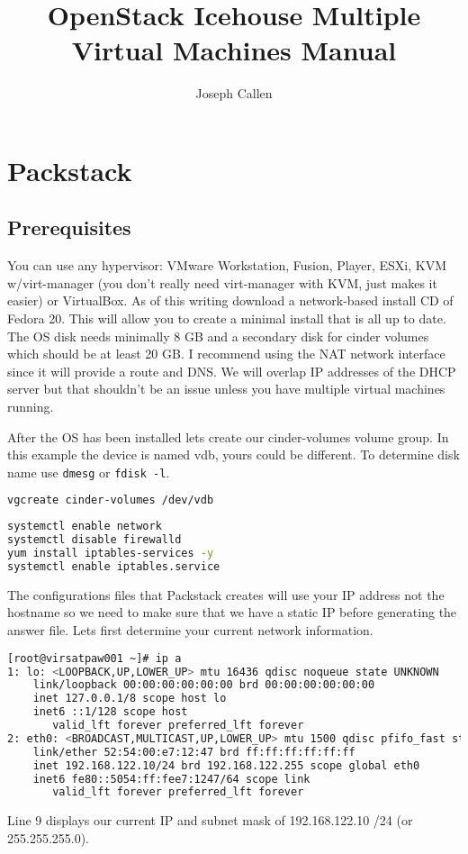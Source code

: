 \documentclass[11pt,letterpaper,oneside]{book}
\title{OpenStack Icehouse Multiple Virtual Machines Manual}
\author{Joseph Callen}
\begin{document}
\frontmatter


\maketitle
\mainmatter



\chapter{Packstack}
\section{Prerequisites}
You can use any hypervisor: VMware Workstation, Fusion, Player, ESXi, KVM w/virt-manager (you don't really need virt-manager with KVM, just makes it easier) or  VirtualBox.  As of this writing download a network-based install CD of Fedora 20.  This will allow you to create a minimal install that is all up to date.  The OS disk needs minimally 8 GB and a secondary disk for cinder volumes which should be at least 20 GB.  I recommend using the NAT network interface since it will provide a route and DNS.  We will overlap IP addresses of the DHCP server but that shouldn't be an issue unless you have multiple virtual machines running.

After the OS has been installed lets create our cinder-volumes volume group.  In this example the device is named vdb, yours could be different.  To determine disk name use \texttt{dmesg} or \texttt{fdisk -l}.
\begin{lstlisting}[caption={Create Cinder Volume VG},language=bash]
vgcreate cinder-volumes /dev/vdb
\end{lstlisting}

\begin{lstlisting}[caption={Disable firewalld, enable iptables-services},language=bash]
systemctl enable network
systemctl disable firewalld
yum install iptables-services -y
systemctl enable iptables.service
\end{lstlisting}

The configurations files that Packstack creates will use your IP address not the hostname so we need to make sure that we have a static IP before generating the answer file.  Lets first determine your current network information.
\begin{lstlisting}[caption={Current IP address},language=bash]
[root@virsatpaw001 ~]# ip a
1: lo: <LOOPBACK,UP,LOWER_UP> mtu 16436 qdisc noqueue state UNKNOWN 
    link/loopback 00:00:00:00:00:00 brd 00:00:00:00:00:00
    inet 127.0.0.1/8 scope host lo
    inet6 ::1/128 scope host 
       valid_lft forever preferred_lft forever
2: eth0: <BROADCAST,MULTICAST,UP,LOWER_UP> mtu 1500 qdisc pfifo_fast state UP qlen 1000
    link/ether 52:54:00:e7:12:47 brd ff:ff:ff:ff:ff:ff
    inet 192.168.122.10/24 brd 192.168.122.255 scope global eth0
    inet6 fe80::5054:ff:fee7:1247/64 scope link 
       valid_lft forever preferred_lft forever
\end{lstlisting}
Line 9 displays our current IP and subnet mask of 192.168.122.10 /24 (or 255.255.255.0).
\end{document}
